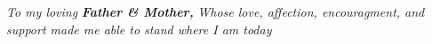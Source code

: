 \chapter*{}
\begin{center}
{\centering \it To my loving} 
\linebreak \linebreak
{\centering \it \bf Father \& Mother,} 
\linebreak \linebreak
{\centering \it Whose love, affection, encouragment, and support made me able to stand where I am today }
\end{center} 